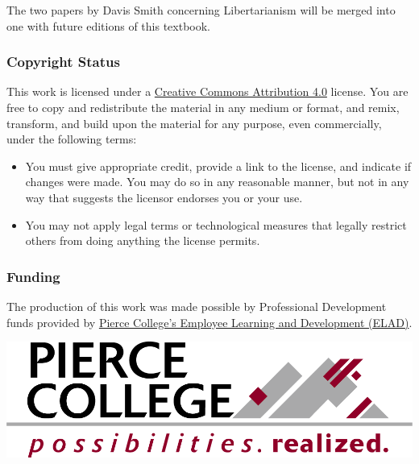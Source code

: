 The two papers by Davis Smith concerning Libertarianism will be merged into one with future editions of this textbook.

\subsubsection{Copyright Status}

This work is licensed under a \href{https://creativecommons.org/licenses/by/4.0/}{Creative Commons Attribution 4.0} license.
You are free to copy and redistribute the material in any medium or format, and  remix, transform, and build upon the material for any purpose, even commercially, under the following terms:
\begin{itemize}
\item You must give appropriate credit, provide a link to the license, and indicate if changes were made. You may do so in any reasonable manner, but not in any way that suggests the licensor endorses you or your use.
\item You may not apply legal terms or technological measures that legally restrict others from doing anything the license permits.
\end{itemize}

\subsubsection{Funding}

The production of this work was made possible by Professional Development funds provided by \href{https://www.pierce.ctc.edu/elad}{Pierce College's Employee Learning and Development (ELAD)}. 


\includegraphics{marcom-PierceCollege-Logo.png}


\bigskip
